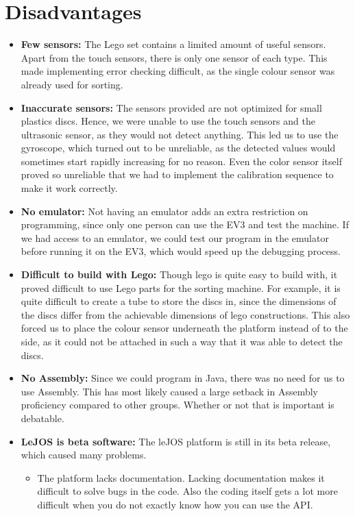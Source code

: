 \documentclass[a4paper,oneside,11pt]{article}
\begin{document}
\section{Disadvantages}
\begin{itemize}
    \item \textbf{Few sensors:} The Lego set contains a limited amount of useful sensors.  Apart from the touch sensors, there is only one sensor of each type. This made implementing error checking difficult, as the single colour sensor was already used for sorting. 
    \item \textbf{Inaccurate sensors:} The sensors provided are not optimized for small plastics discs. Hence, we were unable to use the touch sensors and the ultrasonic sensor, as they would not detect anything. This led us to use the gyroscope, which turned out to be unreliable, as the detected values would sometimes start rapidly increasing for no reason. Even the color sensor itself proved so unreliable that we had to implement the calibration sequence to make it work correctly.
    \item \textbf{No emulator:} Not having an emulator adds an extra restriction on programming, since only one person can use the EV3 and test the machine. If we had access to an emulator, we could test our program in the emulator before running it on the EV3, which would speed up the debugging process.
    \item \textbf{Difficult to build with Lego:} Though lego is quite easy to build with, it proved difficult to use Lego parts for the sorting machine. For example, it is quite difficult to create a tube to store the discs in, since the dimensions of the discs differ from the achievable dimensions of lego constructions. This also forced us to place the colour sensor underneath the platform instead of to the side, as it could not be attached in such a way that it was able to detect the discs.
    \item \textbf{No Assembly:} Since we could program in Java, there was no need for us to use Assembly. This has most likely caused a large setback in Assembly proficiency compared to other groups. Whether or not that is important is debatable.
    \item \textbf{LeJOS is beta software: } The leJOS platform is still in its beta release, which caused many problems.
		\begin{itemize}
            \item The platform lacks documentation. Lacking documentation makes it difficult to solve bugs in the code. Also the coding itself gets a lot more difficult when you do not exactly know how you can use the API.

\end{itemize}
\end{itemize}
\end{document}
